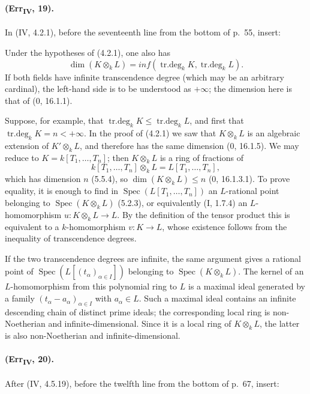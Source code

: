 \paragraph{(Err\textsubscript{IV}, 19).}
In (IV, 4.2.1), before the seventeenth line from the bottom of p.~55,
insert:

\begin{remark}[4.2.1.4]
Under the hypotheses of (4.2.1), one also has
\begin{equation}
 \dim(K\otimes_kL)=inf(\operatorname{tr.deg}_kK,
                           \operatorname{tr.deg}_kL). \tag{4.2.1.5}
\end{equation}
If both fields have infinite transcendence degree (which may be an
arbitrary cardinal), the left-hand side is to be understood as
$+\infty$; the dimension here is that of ($0$, 16.1.1).

Suppose, for example, that
$\operatorname{tr.deg}_kK\leq\operatorname{tr.deg}_kL$, and first that
$\operatorname{tr.deg}_kK=n<+\infty$.  In the proof of (4.2.1) we saw
that $K\otimes_kL$ is an algebraic extension of $K'\otimes_kL$, and
therefore has the same dimension ($0$, 16.1.5).  We may reduce to
$K=k[T_1,\ldots,T_n]$; then $K\otimes_kL$ is a ring of fractions of
\[
 k[T_1,\ldots,T_n]\otimes_kL=L[T_1,\ldots,T_n],
\]
which has dimension $n$ (5.5.4), so
$\dim(K\otimes_kL)\leq n$ ($0$, 16.1.3.1).  To prove equality, it is
enough to find in $\operatorname{Spec}(L[T_1,\ldots,T_n])$ an
$L$-rational point belonging to $\operatorname{Spec}(K\otimes_kL)$
(5.2.3), or equivalently (I, 1.7.4) an $L$-homomorphism
$u:K\otimes_kL\to L$.  By the definition of the tensor product this is
equivalent to a $k$-homomorphism $v:K\to L$, whose existence follows
from the inequality of transcendence degrees.

If the two transcendence degrees are infinite, the same argument gives
a rational point of $\operatorname{Spec}(L[(t_\alpha)_{\alpha\in I}])$
belonging to $\operatorname{Spec}(K\otimes_kL)$.  The kernel of an
$L$-homomorphism from this polynomial ring to $L$ is a maximal ideal
generated by a family $(t_\alpha-a_\alpha)_{\alpha\in I}$ with
$a_\alpha\in L$.  Such a maximal ideal contains an infinite descending
chain of distinct prime ideals; the corresponding local ring is
non-Noetherian and infinite-dimensional.  Since it is a local ring of
$K\otimes_kL$, the latter is also non-Noetherian and
infinite-dimensional.
\end{remark}

\paragraph{(Err\textsubscript{IV}, 20).}
After (IV, 4.5.19), before the twelfth line from the bottom of p.~67,
insert:

